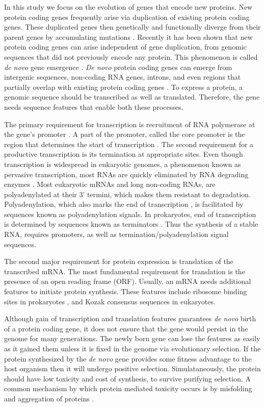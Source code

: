 \documentclass[12pt,a4paper]{article}
\begin{document}
In this study we focus on the evolution of genes that encode new proteins. New protein coding genes frequently arise via duplication of existing protein coding genes. These duplicated genes then genetically and functionally diverge from their parent genes by accumulating mutations \citep{Long2003,IAD}. Recently it has been shown that new protein coding genes can arise independent of gene duplication, from genomic sequences that did not previously encode any protein. This phenomenon is called \textit{de novo} gene emergence \citep{EBB-F1000,vanOss}. \textit{De novo} protein coding genes can emerge from intergenic sequences, non-coding RNA genes, introns, and even regions that partially overlap with existing protein coding genes \citep{vanOss}. To express a protein, a genomic sequence should be transcribed as well as translated. Therefore, the gene needs sequence features that enable both these processes. 

The primary requirement for transcription is recruitment of RNA polymerase at the gene's promoter \citep{Promoters}. A part of the promoter, called the core promoter is the region that determines the start of transcription \citep{corepromoters}. The second requirement for a productive transcription is its termination at appropriate sites. Even though transcription is widespread in eukaryotic genomes, a phenomenon known as pervasive transcription, most RNAs are quickly eliminated by RNA degrading enzymes \citep{RNAturnover}. Most eukaryotic mRNAs and long non-coding RNAs, are polyadenylated at their 3' termini, which makes them resistant to degradation. Polyadenylation, which also marks the end of transcription \citep{polyAterm}, is facilitated by sequences known as polyadenylation signals. In prokaryotes, end of transcription is determined by sequences known as terminators \citep{ProkTerm}. Thus the synthesis of a stable RNA, requires promoters, as well as termination/polyadenylation signal sequences.

The second major requirement for protein expression is translation of the transcribed mRNA. The most fundamental requirement for translation is the presence of an open reading frame (ORF). Usually, an mRNA needs additional features to initiate protein synthesis. These features include ribosome binding sites in prokaryotes \citep{RBS}, and Kozak consensus sequences \citep{kozak} in eukaryotes. 

Although gain of transcription and translation features guarantees \textit{de novo} birth of a protein coding gene, it does not ensure that the gene would persist in the genome for many generations. The newly born gene can lose the features as easily as it gained them unless it is fixed in the genome via evolutionary selection. If the protein synthesized by the \textit{de novo} gene provides some fitness advantage to the host organism then it will undergo positive selection. Simulataneously, the protein should have low toxicity and cost of synthesis, to survive purifying selection. A common mechanism by which protein mediated toxicity occurs is by misfolding and aggregation of proteins \citep{misfold1,misfold2}.
\end{document}
